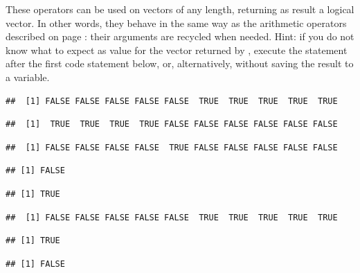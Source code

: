 \documentclass[krantz2]{krantz}\usepackage{knitr}%
\begin{document}
These operators can be used on vectors of any length, returning as result a logical vector. In other words, they behave in the same way as the arithmetic operators described on page \pageref{par:vectorized:numeric}: their arguments are recycled when needed. Hint: if you do not know what to expect as value for the vector returned by , execute the statement  after the first code statement below, or, alternatively,  without saving the result to a variable.

\begin{knitrout}\footnotesize
{}\color{fgcolor}\begin{kframe}
\begin{alltt}
 \hlkwb{<-} \hlopt{:}
 \hlopt{>} 
\end{alltt}
\begin{verbatim}
##  [1] FALSE FALSE FALSE FALSE FALSE  TRUE  TRUE  TRUE  TRUE  TRUE
\end{verbatim}
\begin{alltt}
 \hlopt{<} 
\end{alltt}
\begin{verbatim}
##  [1]  TRUE  TRUE  TRUE  TRUE FALSE FALSE FALSE FALSE FALSE FALSE
\end{verbatim}
\begin{alltt}
 \hlopt{==} 
\end{alltt}
\begin{verbatim}
##  [1] FALSE FALSE FALSE FALSE  TRUE FALSE FALSE FALSE FALSE FALSE
\end{verbatim}
\begin{alltt}
 \hlopt{>} \hlstd{)}
\end{alltt}
\begin{verbatim}
## [1] FALSE
\end{verbatim}
\begin{alltt}
 \hlopt{>} \hlstd{)}
\end{alltt}
\begin{verbatim}
## [1] TRUE
\end{verbatim}
\begin{alltt}
 \hlkwb{<-}  \hlopt{>} 
\end{alltt}
\begin{verbatim}
##  [1] FALSE FALSE FALSE FALSE FALSE  TRUE  TRUE  TRUE  TRUE  TRUE
\end{verbatim}
\begin{alltt}
\end{alltt}
\begin{verbatim}
## [1] TRUE
\end{verbatim}
\begin{alltt}
\end{alltt}
\begin{verbatim}
## [1] FALSE
\end{verbatim}
\end{kframe}
\end{knitrout}
\end{document}
